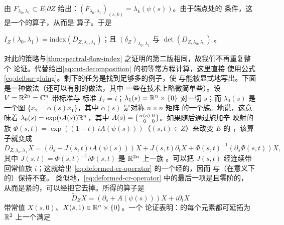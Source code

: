 \trBoundaryCondition{}由\trLagrange\trSubbundle{} $F_{\lambda_0,\lambda_1}\subset E|\partial Z$
给出：$(F_{\lambda_0,\lambda_1})_{(s,k)}=\lambda_k(\psi(s))$。由于端点处的%
\trTransversality{}条件，这是一个\trNondegenerate{}的\trCauchyRiemann{}算子，从而是%
\trFredholm{}算子。于是
\begin{lemma}\label{thm:path-space-det-line}
$I_Z(\lambda_0,\lambda_1)=\mathrm{index}(D_{Z,\lambda_0,\lambda_1})$；且
$(\delta_Z)_{\lambda_0,\lambda_1}$ 与 $\det(D_{Z,\lambda_0,\lambda_1})$
\trCanonical{}\trIsomorphic。
\end{lemma}
对此的策略与\cref{thm:spectral-flow-index} 之证明的第二版相同，故我们不再重复整个
论证。代替给出\eqref{eq:cut-decomposition} 的初等常\trDifferential{}方程计算，这里直接
使用\trGluing{}公式\eqref{eq:delbar-gluing}。剩下的任务是找到足够多的例子，使%
\trIndex{}与\trDeterminantLine{}能被显式地写出。下面是一种做法（还可以有别的做法，其中
一些在技术上略微简单些）。设 $V=\mathbb{R}^{2n}=\mathbb{C}^n$ 带标准\trSymplecticStructure{}与
标准\trComplexStructure{} $I_V=i$；$\lambda_1(s)=\mathbb{R}^n\times\{0\}$ 对一切 $s$；而
$\lambda_0(s)$ 是一个图 $\{x_2=\alpha(s)x_1\}$，其中 $\alpha(s)$ 是对称 $n\times n$ 矩阵
的一个族。\trEquivalence{}地说，这意味着 $\lambda_0(s)=\exp(iA(s))\mathbb{R}^n$，其中
$A(s)=\begin{psmallmatrix}\alpha(s) & 0\\ 0 & 0\end{psmallmatrix}$。如果随后通过施加辛%
\trLinear{}映射的族 $\Phi(s,t)=\exp((1-t)\,iA(\psi(s)))$（$(s,t)\in Z$）来改变 $E$ 的%
\trTrivialization，该算子就变成
\begin{equation}\label{eq:deformed-cr-operator}
D_{Z,\lambda_0,\lambda_1}X=(\partial_s-J(s,t)iA(\psi(s)))X+J(s,t)\partial_t X
+\Phi(s,t)^{-1}(\partial_s\Phi(s,t))X,
\end{equation}
其中 $J(s,t)=\Phi(s,t)^{-1}i\Phi(s,t)$ 是 $\mathbb{R}^{2n}$ 上一族\trCompatible{}%
\trComplexStructure。可以把 $J(s,t)$ 经连续\trDeformation{}带回常值族 $i$；这就给出
\eqref{eq:deformed-cr-operator} 的一个经\trFredholmOperator{}的\trHomotopy，因而%
\trIndex{}与（在\trCanonical{}\trIsomorphism{}意义下的）\trDeterminantLine{}保持不变。
类似地，\eqref{eq:deformed-cr-operator} 中的最后一项是\trCompactlySupported{}且零阶的，
从而是紧的，可以经\trDeformation{}把它去掉。所得的算子是
\begin{equation*}
\tilde{D}_Z X=(\partial_s+A(\psi(s)))X+i\partial_t X
\end{equation*}
带常值\trBoundaryCondition{} $X(s,0)$、$X(s,1)\in\mathbb{R}^n\times\{0\}$。一个%
\trEllipticRegularity{}论证表明：\trKernel{}的每个元素都可延拓为 $\mathbb{R}^2$ 上一个满足%
